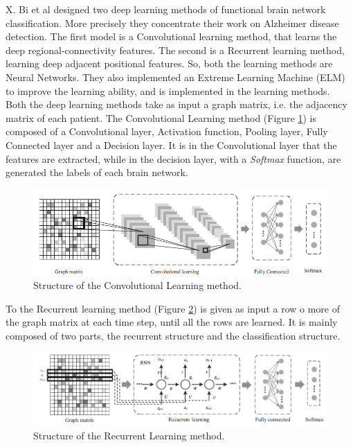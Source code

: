 X. Bi et al \cite{Bi2019FunctionalBN} designed two deep learning methods of functional brain network classification. More precisely they concentrate their work on Alzheimer disease detection. The first model is a Convolutional learning method, that learns the deep regional-connectivity features. The second is a Recurrent learning method, learning deep adjacent positional features. So, both the learning methods are Neural Networks. They also implemented an Extreme Learning Machine (ELM) to improve the learning ability, and is implemented in the learning methods.
\\

Both the deep learning methods take as input a graph matrix, i.e. the adjacency matrix of each patient. 
The Convolutional Learning method (Figure \ref{fig:diagram8}) is composed of a Convolutional layer, Activation function, Pooling layer, Fully Connected layer and a Decision layer. It is in the Convolutional layer that the features are extracted, while in the decision layer, with a \textit{Softmax} function, are generated the labels of each brain network.

\begin{figure}[htbp]
	\centering
	\includegraphics[scale=0.5]{Immagini/functional1.PNG}
	\caption{Structure of the Convolutional Learning method.}
	\label{fig:diagram8}
\end{figure}

To the Recurrent learning method (Figure \ref{fig:diagram9}) is given as input a row o more of the graph matrix at each time step, until all the rows are learned. It is mainly composed of two parts, the recurrent structure and the classification structure. 

\begin{figure}[htbp]
	\centering
	\includegraphics[scale=0.5]{Immagini/functional2.PNG}
	\caption{Structure of the Recurrent Learning method.}
	\label{fig:diagram9}
\end{figure}

